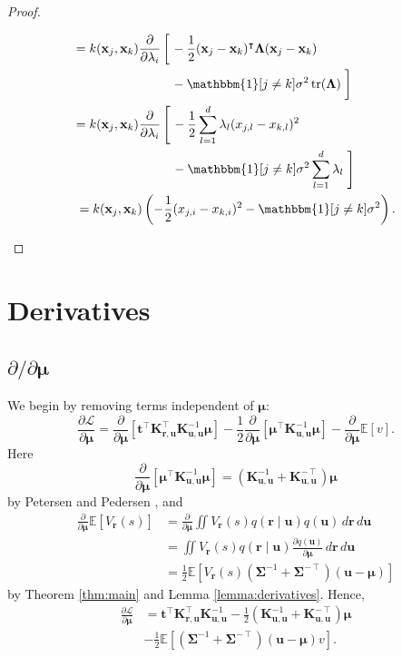 \documentclass{mpaper}
\DeclareMathOperator{\tr}{tr}
\newcommand{\V}{V_{\mathbf{r}}}
\newcommand{\dx}{\,d\mathbf{r}\,d\mathbf{u}}
\newcommand{\Kuu}{\mathbf{K}_{\mathbf{u},\mathbf{u}}}
\newcommand{\Kru}{\mathbf{K}_{\mathbf{r},\mathbf{u}}}
\newcommand{\dm}{\frac{\partial}{\partial\bm\mu}}
\newcommand{\dl}{\frac{\partial}{\partial \lambda_i}}
\begin{document}
\begin{proof}
\begin{enumerate}
\begin{enumerate}
\begin{align*}
      &\begin{aligned}
        = k(\mathbf{x}_j, \mathbf{x}_k) \dl \left[ \vphantom{\frac{1}{2}} \right. &-\frac{1}{2}(\mathbf{x}_j - \mathbf{x}_k)^\intercal \bm\Lambda (\mathbf{x}_j - \mathbf{x}_k) \\
        &- \mathbbm{1}[j \ne k]\sigma^2\tr(\bm\Lambda) \left. \vphantom{\frac{1}{2}} \right]
      \end{aligned} \\
      &\begin{aligned}
        = k(\mathbf{x}_j, \mathbf{x}_k) \dl \left[ \vphantom{\sum_{k=1}^d} \right. &-\frac{1}{2} \sum_{l=1}^d \lambda_l (x_{j,l} - x_{k,l})^2 \\
        &- \mathbbm{1}[j \ne k]\sigma^2\sum_{l=1}^d \lambda_l \left. \vphantom{\sum_{l=1}^d} \right]
      \end{aligned} \\
      &= k(\mathbf{x}_j, \mathbf{x}_k) \left( -\frac{1}{2}(x_{j,i} - x_{k,i})^2 - \mathbbm{1}[j \ne k]\sigma^2 \right).
    \end{align*}
    \end{enumerate}
  \end{enumerate}
\end{proof}

\section{Derivatives}

\subsection{\texorpdfstring{$\partial/\partial\bm\mu$}{Derivative w.r.t. mu}}

We begin by removing terms independent of $\bm\mu$:
\[
  \frac{\partial\mathcal{L}}{\partial\bm\mu} =
  \dm[\mathbf{t}^\intercal\Kru^\intercal\Kuu^{-1}\bm\mu] - \frac{1}{2} \dm
  \left[ \bm\mu^\intercal \Kuu^{-1} \bm\mu \right] - \dm\mathbb{E}[v].
\]
Here
\[
  \dm \left[ \bm\mu^\intercal \Kuu^{-1} \bm\mu \right] = (\Kuu^{-1} +
  \Kuu^{-\intercal}) \bm\mu
\]
by Petersen and Pedersen \cite{petersen2008matrix}, and
\[
  \begin{split}
    \dm\mathbb{E}[\V(s)] &= \dm\iint \V(s) q(\mathbf{r} \mid \mathbf{u})
    q(\mathbf{u})\dx \\
    &= \iint \V(s) q(\mathbf{r} \mid \mathbf{u}) \frac{\partial
      q(\mathbf{u})}{\partial \bm\mu}\dx \\
    &= \frac{1}{2}\mathbb{E}[\V(s) (\bm\Sigma^{-1} +
    \bm\Sigma^{-\intercal})(\mathbf{u} - \bm\mu)]
  \end{split}
\]
by Theorem \ref{thm:main} and Lemma \ref{lemma:derivatives}. Hence,
\[
  \begin{split}
    \frac{\partial\mathcal{L}}{\partial\bm\mu} &=
    \mathbf{t}^\intercal\Kru^\intercal\Kuu^{-1} - \frac{1}{2} (\Kuu^{-1} +
    \Kuu^{-\intercal}) \bm\mu \\
    &- \frac{1}{2}\mathbb{E} \left[(\bm\Sigma^{-1} +
      \bm\Sigma^{-\intercal})(\mathbf{u} - \bm\mu) v \right].
  \end{split}
\]
\end{document}
